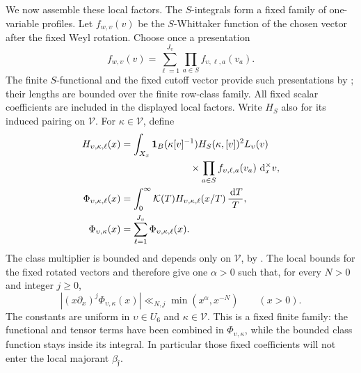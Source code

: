 We now assemble these local factors.  The \(S\)-integrals form a fixed
family of one-variable profiles.  Let
\(f_{w,\upsilon}(v)\) be the \(S\)-Whittaker function of the chosen vector
after the fixed Weyl rotation.  Choose once a presentation
\[
 f_{w,\upsilon}(v)
   =\sum_{\ell=1}^{J_\upsilon}\prod_{a\in S}
          f_{\upsilon,\ell,a}(v_a).
\]
The finite \(S\)-functional and the fixed cutoff vector provide such
presentations by ;
their lengths are bounded over
the finite row-class family.  All fixed scalar coefficients are included
in the displayed local factors.  Write \(H_S\) also for its induced
pairing on \(\mathcal V\).  For \(\kappa\in\mathcal V\), define
\begin{equation}\label{eq:reflection-profiles}
\begin{split}
 H_{\upsilon,\kappa,\ell}(x)
  &=\int_{X_x}\one_B(\kappa[v]^{-1})H_S(\kappa,[v])^2L_\upsilon(v)\\
  &\hspace{25mm}\times
       \prod_{a\in S}f_{\upsilon,\ell,a}(v_a)\,\dd_x^\times v,\\
 \Phi_{\upsilon,\kappa,\ell}(x)
  &=\int_0^\infty\mathcal K(T)H_{\upsilon,\kappa,\ell}(x/T)
           \,\frac{\dd T}{T},\\
 \Phi_{\upsilon,\kappa}(x)
  &=\sum_{\ell=1}^{J_\upsilon}\Phi_{\upsilon,\kappa,\ell}(x).
\end{split}
\end{equation}
The class multiplier is bounded and depends only on \(\mathcal V\), by
.  The local bounds for the fixed rotated
vectors and  therefore give
one \(\alpha>0\) such that, for every \(N>0\) and integer \(j\ge0\),
\begin{equation}\label{eq:reflection-profile-bound}
 |(x\partial_x)^j\Phi_{\upsilon,\kappa}(x)|
       \ll_{N,j}\min(x^\alpha,x^{-N})\qquad(x>0).
\end{equation}
The constants are uniform in \(\upsilon\in U_6\) and
\(\kappa\in\mathcal V\).  This is a fixed finite family: the functional
and tensor terms have been combined in \(\Phi_{\upsilon,\kappa}\), while
the bounded class function stays inside its integral.  In particular
those fixed coefficients will not enter the local majorant
\(\beta_{\mathfrak f}\).

